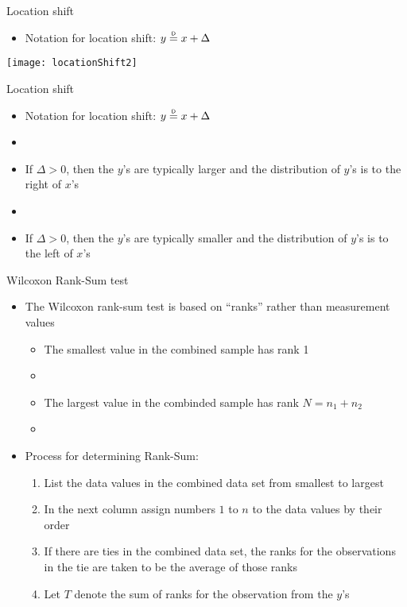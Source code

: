 \documentclass[xcolor=dvipsnames]{beamer}
\newcommand\myeq{\mathrel{\overset{\makebox[0pt]{\mbox{\normalfont\tiny\sffamily D}}}{=}}}
\begin{document}
\begin{frame}{Location shift}
	\begin{itemize}
		\item Notation for location shift: $y \myeq x + \Delta$
	\end{itemize}
\begin{center}
	\texttt{[image: locationShift2]}
\end{center}
\end{frame}

\begin{frame}{Location shift}
	\begin{itemize}
		\item Notation for location shift: $y \myeq x + \Delta$
		\item[]
		\item If $\Delta > 0$, then the $y$'s are typically larger and the distribution of $y$'s is to the right of $x$'s
		\item[]
		\item If $\Delta > 0$, then the $y$'s are typically smaller and the distribution of $y$'s is to the left of $x$'s
	\end{itemize}
\end{frame}

\begin{frame}{Wilcoxon Rank-Sum test}
	\begin{itemize}
		\item The Wilcoxon rank-sum test is based on ``ranks'' rather than measurement values
		\begin{itemize}
			\item The smallest value in the combined sample has rank 1
			\item[]
			\item The largest value in the combinded sample has rank $N = n_1 + n_2$
			\item[]
		\end{itemize}
	\item Process for determining Rank-Sum:
		\begin{enumerate}
		\item List the data values in the combined data set from smallest to largest
		\item In the next column assign numbers $1$ to $n$ to the data values by their order
		\item If there are ties in the combined data set, the ranks for the observations in the tie are taken to be the average of those ranks
		\item Let $T$ denote the sum of ranks for the observation from the $y$'s
	\end{enumerate}
	\end{itemize}
\end{frame}
\end{document}
